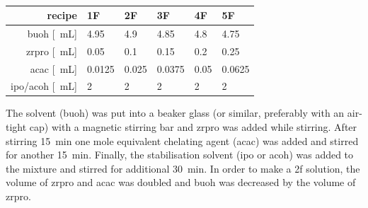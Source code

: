 \documentclass[a4paper]{article}
\newcommand{\td}[1]{\textcolor{red}{#1}}
\newcommand{\ds}[1]{}
\newcommand{\ml}[1]{\SI{#1}{\milli\liter}}
\newcommand{\minutes}[1]{\SI{#1}{\minute}}
\begin{document}
\begin{table}[h]
	\centering
	\caption{}
	\label{tab:rec2}
	\begin{tabular}{rlllll}
		\hline
		recipe	&1F		&2F		&3F		&4F		&5F		\\
		\hline
		\gls{buoh} [\ml{}]		&4.95	&4.9	&4.85	&4.8	&4.75	\\
		\gls{zrpro} [\ml{}]	&0.05	&0.1	&0.15	&0.2	&0.25	\\
		\gls{acac} [\ml{}]		&0.0125	&0.025	&0.0375	&0.05	&0.0625	\\
		\gls{ipo}/\gls{acoh} [\ml{}]		&2		&2		&2		&2		&2		\\
		\hline
	\end{tabular}
\end{table}

The solvent (\gls{buoh}) was put into a beaker glass (or similar, preferably with an 
air-tight cap) with a magnetic stirring bar and \gls{zrpro} was added while stirring. After 
stirring \minutes{\ds{10 to }15} one mole equivalent chelating agent (\gls{acac}) was 
added and stirred for another \minutes{\ds{10 to }15}. Finally, the stabilisation 
solvent\cite{Hu2016} (\gls{ipo} or \gls{acoh}) was added to the mixture and stirred for 
additional \minutes{\ds{20-}30}. 
In order to make a \gls{2f} solution, the volume of \gls{zrpro} and \gls{acac} was 
doubled and \gls{buoh} was decreased by the volume of \gls{zrpro}. 
\end{document}
